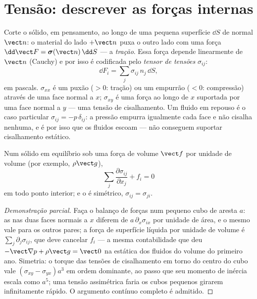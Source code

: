 \section{Tensão: descrever as forças internas}

\begin{definition}\label{def:b3:continuum-elasticity:stress}
Corte o sólido, em pensamento, ao longo de uma pequena superfície
$\dd S$ de normal $\vect n$: o material do lado $+\vect n$ puxa o
outro lado com uma força
$\dd\vect F = \boldsymbol\sigma(\vect n)\,\dd S$ --- a \emph{tração}.
Essa força depende linearmente de $\vect n$ (Cauchy) e por isso é
codificada pelo \emph{tensor de tensões} $\sigma_{ij}$:
\[
\dd F_i = \sum_j \sigma_{ij}\,n_j\,\dd S ,
\]
em pascals. $\sigma_{xx}$ é um puxão ($> 0$: tração) ou um empurrão
($< 0$: compressão) através de uma face normal a $x$; $\sigma_{xy}$ é
uma força ao longo de $x$ suportada por uma face normal a $y$ --- uma
tensão de cisalhamento. Um fluido em repouso é o caso particular
$\sigma_{ij} = -p\,\delta_{ij}$: a pressão empurra igualmente cada face
e não cisalha nenhuma, e é por isso que os fluidos escoam --- não
conseguem suportar cisalhamento estático.
\end{definition}

\begin{proposition}\label{prop:b3:continuum-elasticity:equilibrium}
Num sólido em equilíbrio sob uma força de volume $\vect f$ por unidade
de volume (por exemplo, $\rho\vect g$),
\[
\sum_j\frac{\partial\sigma_{ij}}{\partial x_j} + f_i = 0
\]
em todo ponto interior; e o  é simétrico,
$\sigma_{ij} = \sigma_{ji}$.
\end{proposition}

\begin{proof}[Demonstração parcial]
Faça o balanço de forças num pequeno cubo de aresta $a$: as 
nas duas faces normais a $x$ diferem de $a\,\partial_x\sigma_{ix}$ por
unidade de área, e o mesmo vale para os outros pares; a força de
superfície líquida por unidade de volume é
$\sum_j\partial_j\sigma_{ij}$, que deve cancelar $f_i$ --- a mesma
contabilidade que deu $-\vect\nabla p + \rho\vect g = \vect 0$ na
estática dos fluidos do volume do primeiro ano. Simetria: o torque das
tensões de cisalhamento em torno do centro do cubo vale $(\sigma_{xy} -
\sigma_{yx})a^3$ em ordem dominante, ao passo que seu momento de
inércia escala como $a^5$; uma tensão assimétrica faria os cubos
pequenos girarem infinitamente rápido. O argumento contínuo completo é
admitido.
\end{proof}

